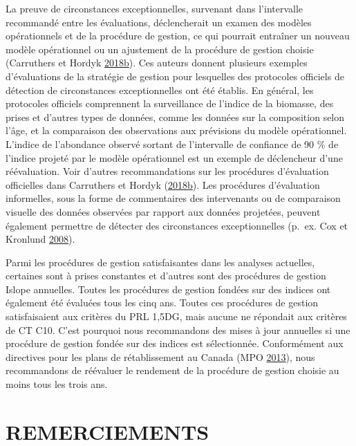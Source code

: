 \documentclass[french,11pt]{book}
\begin{document}
La preuve de circonstances exceptionnelles, survenant dans l'intervalle recommandé entre les évaluations, déclencherait un examen des modèles opérationnels et de la procédure de gestion, ce qui pourrait entraîner un nouveau modèle opérationnel ou un ajustement de la procédure de gestion choisie (Carruthers et Hordyk \protect\hyperlink{ref-carruthers_hordyk_2018}{2018}\protect\hyperlink{ref-carruthers_hordyk_2018}{b}). Ces auteurs donnent plusieurs exemples d'évaluations de la stratégie de gestion pour lesquelles des protocoles officiels de détection de circonstances exceptionnelles ont été établis. En général, les protocoles officiels comprennent la surveillance de l'indice de la biomasse, des prises et d'autres types de données, comme les données sur la composition selon l'âge, et la comparaison des observations aux prévisions du modèle opérationnel. L'indice de l'abondance observé sortant de l'intervalle de confiance de 90 \% de l'indice projeté par le modèle opérationnel est un exemple de déclencheur d'une réévaluation. Voir d'autres recommandations sur les procédures d'évaluation officielles dans Carruthers et Hordyk (\protect\hyperlink{ref-carruthers_hordyk_2018}{2018}\protect\hyperlink{ref-carruthers_hordyk_2018}{b}). Les procédures d'évaluation informelles, sous la forme de commentaires des intervenants ou de comparaison visuelle des données observées par rapport aux données projetées, peuvent également permettre de détecter des circonstances exceptionnelles (p.~ex. Cox et Kronlund \protect\hyperlink{ref-cox2008a}{2008}).

Parmi les procédures de gestion satisfaisantes dans les analyses actuelles, certaines sont à prises constantes et d'autres sont des procédures de gestion Islope annuelles. Toutes les procédures de gestion fondées sur des indices ont également été évaluées tous les cinq ans. Toutes ces procédures de gestion satisfaisaient aux critères du PRL 1,5DG, mais aucune ne répondait aux critères de CT C10. C'est pourquoi nous recommandons des mises à jour annuelles si une procédure de gestion fondée sur des indices est sélectionnée. Conformément aux directives pour les plans de rétablissement au Canada (MPO \protect\hyperlink{ref-dfo2013}{2013}), nous recommandons de réévaluer le rendement de la procédure de gestion choisie au moins tous les trois ans.

\hypertarget{remerciements}{%
\section{REMERCIEMENTS}\label{remerciements}}
\end{document}
